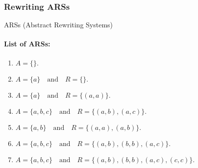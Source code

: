 \documentclass{article}
\theoremstyle{theorem}
\theoremstyle{definition}
\theoremstyle{remark}
\begin{document}
\subsubsection{Rewriting ARSs}
ARSs (Abstract Rewriting Systems)

\paragraph{List of ARSs:}
\begin{enumerate}
  \item $A = \{\}.$
  \item $A = \{a\}\quad\text{and}\quad R = \{\}.$
  \item $A = \{a\}\quad \text{and} \quad R = \{(a,a)\}.$
  \item $A = \{a,b,c\} \quad \text{and} \quad R = \{(a,b), (a,c)\}.$
  \item $A = \{a,b\} \quad \text{and} \quad R = \{(a,a), (a,b)\}.$
  \item $A = \{a,b,c\} \quad \text{and} \quad R = \{(a,b), (b,b), (a,c)\}.$
  \item $A = \{a,b,c\} \quad \text{and} \quad R = \{(a,b), (b,b), (a,c), (c,c)\}.$
\end{enumerate}
\end{document}
